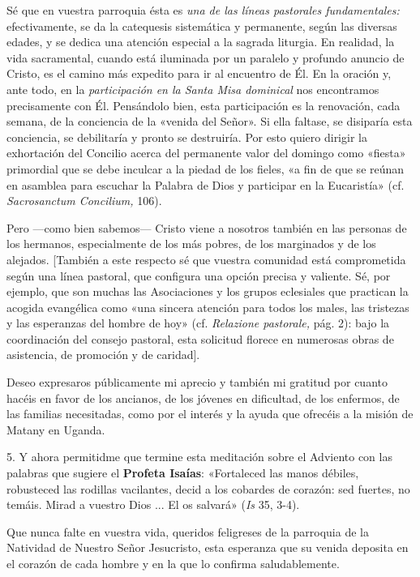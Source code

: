 \documentclass[]{article}
\begin{document}
Sé que en vuestra parroquia ésta es \emph{una de las líneas pastorales
fundamentales:} efectivamente, se da la catequesis sistemática y
permanente, según las diversas edades, y se dedica una atención especial
a la sagrada liturgia. En realidad, la vida sacramental, cuando está
iluminada por un paralelo y profundo anuncio de Cristo, es el camino más
expedito para ir al encuentro de Él. En la oración y, ante todo, en la
\emph{participación en la Santa Misa dominical} nos encontramos
precisamente con Él. Pensándolo bien, esta participación es la
renovación, cada semana, de la conciencia de la «venida del Señor». Si
ella faltase, se disiparía esta conciencia, se debilitaría y pronto se
destruiría. Por esto quiero dirigir la exhortación del Concilio acerca
del permanente valor del domingo como «fiesta» primordial que se debe
inculcar a la piedad de los fieles, «a fin de que se reúnan en asamblea
para escuchar la Palabra de Dios y participar en la Eucaristía» (cf.
\emph{Sacrosanctum Concilium,} 106).

Pero ---como bien sabemos--- Cristo viene a nosotros también en las
personas de los hermanos, especialmente de los más pobres, de los
marginados y de los alejados. {[}También a este respecto sé que vuestra
comunidad está comprometida según una línea pastoral, que configura una
opción precisa y valiente. Sé, por ejemplo, que son muchas las
Asociaciones y los grupos eclesiales que practican la acogida evangélica
como «una sincera atención para todos los males, las tristezas y las
esperanzas del hombre de hoy» (cf. \emph{Relazione pastorale,} pág. 2):
bajo la coordinación del consejo pastoral, esta solicitud florece en
numerosas obras de asistencia, de promoción y de caridad{]}.

Deseo expresaros públicamente mi aprecio y también mi gratitud por
cuanto hacéis en favor de los ancianos, de los jóvenes en dificultad, de
los enfermos, de las familias necesitadas, como por el interés y la
ayuda que ofrecéis a la misión de Matany en Uganda.

5. Y ahora permitidme que termine esta meditación sobre el Adviento con
las palabras que sugiere el \textbf{Profeta Isaías}: «Fortaleced las
manos débiles, robusteced las rodillas vacilantes, decid a los cobardes
de corazón: sed fuertes, no temáis. Mirad a vuestro Dios ... El os
salvará» (\emph{Is} 35, 3-4).

Que nunca falte en vuestra vida, queridos feligreses de la parroquia de
la Natividad de Nuestro Señor Jesucristo, esta esperanza que su venida
deposita en el corazón de cada hombre y en la que lo confirma
saludablemente.
\end{document}
